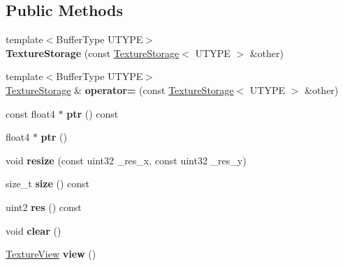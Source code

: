 \subsection*{Public Methods}
\begin{DoxyCompactItemize}
\item 
\mbox{\label{struct_texture_storage_a584ef62e8868deeeb654375c6643bd1e}} 
{\footnotesize template$<$Buffer\+Type U\+T\+Y\+PE$>$ }\\{\bfseries Texture\+Storage} (const \hyperlink{struct_texture_storage}{Texture\+Storage}$<$ U\+T\+Y\+PE $>$ \&other)
\item 
\mbox{\label{struct_texture_storage_abb2bcf6e9a38a4c89d75c0d161d544d3}} 
{\footnotesize template$<$Buffer\+Type U\+T\+Y\+PE$>$ }\\\hyperlink{struct_texture_storage}{Texture\+Storage} \& {\bfseries operator=} (const \hyperlink{struct_texture_storage}{Texture\+Storage}$<$ U\+T\+Y\+PE $>$ \&other)
\item 
\mbox{\label{struct_texture_storage_af4c7e0d0e894dad60ee082ea7109d9ad}} 
const float4 $\ast$ {\bfseries ptr} () const
\item 
\mbox{\label{struct_texture_storage_a79561a373f4ad6510102f13e5b7b7f7c}} 
float4 $\ast$ {\bfseries ptr} ()
\item 
\mbox{\label{struct_texture_storage_a4ff314c9eef9a602c6b5865c4a706cf2}} 
void {\bfseries resize} (const uint32 \+\_\+res\+\_\+x, const uint32 \+\_\+res\+\_\+y)
\item 
\mbox{\label{struct_texture_storage_ae01c35ac88ab64804cca54a07f5cc043}} 
size\+\_\+t {\bfseries size} () const
\item 
\mbox{\label{struct_texture_storage_ad9991e3ce7511048b547793aafc3e17d}} 
uint2 {\bfseries res} () const
\item 
\mbox{\label{struct_texture_storage_a0aed3053102740f81a8fd2e1c3b4f5bf}} 
void {\bfseries clear} ()
\item 
\mbox{\label{struct_texture_storage_a94143c019c4589c782e854a1b550734c}} 
\hyperlink{struct_texture_view}{Texture\+View} {\bfseries view} ()
\end{DoxyCompactItemize}
